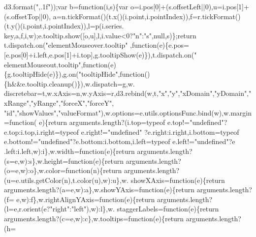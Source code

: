 \begin{DoxyCode}
      d3.format(\textcolor{stringliteral}{",.1f"}));var b=\textcolor{keyword}{function}(i,s)\{var o=i.pos[0]+(s.offsetLeft||0),u=i.pos[1]+(s.offsetTop||0),
      a=n.tickFormat()(t.x()(i.point,i.pointIndex)),f=r.tickFormat()(t.y()(i.point,i.pointIndex)),l=p(i.series.
      key,a,f,i,w);e.tooltip.show([o,u],l,i.value<0?\textcolor{stringliteral}{"n"}:\textcolor{stringliteral}{"s"},null,s)\};\textcolor{keywordflow}{return} t.dispatch.on(\textcolor{stringliteral}{"elementMouseover.tooltip"}
      ,\textcolor{keyword}{function}(e)\{e.pos=[e.pos[0]+i.left,e.pos[1]+i.top],g.tooltipShow(e)\}),t.dispatch.on(\textcolor{stringliteral}{"
      elementMouseout.tooltip"},\textcolor{keyword}{function}(e)\{g.tooltipHide(e)\}),g.on(\textcolor{stringliteral}{"tooltipHide"},\textcolor{keyword}{function}()\{h&&e.tooltip.cleanup()\}),w.dispatch=g,w.
      discretebar=t,w.xAxis=n,w.yAxis=r,d3.rebind(w,t,\textcolor{stringliteral}{"x"},\textcolor{stringliteral}{"y"},\textcolor{stringliteral}{"xDomain"},\textcolor{stringliteral}{"yDomain"},\textcolor{stringliteral}{"xRange"},\textcolor{stringliteral}{"yRange"},\textcolor{stringliteral}{"forceX"},\textcolor{stringliteral}{"forceY"},\textcolor{stringliteral}{
      "id"},\textcolor{stringliteral}{"showValues"},\textcolor{stringliteral}{"valueFormat"}),w.options=e.utils.optionsFunc.bind(w),w.margin=\textcolor{keyword}{function}(
      e)\{\textcolor{keywordflow}{return} arguments.length?(i.top=typeof e.top!=\textcolor{stringliteral}{"undefined"}?e.top:i.top,i.right=typeof e.right!=\textcolor{stringliteral}{"undefined"}
      ?e.right:i.right,i.bottom=typeof e.bottom!=\textcolor{stringliteral}{"undefined"}?e.bottom:i.bottom,i.left=typeof e.left!=\textcolor{stringliteral}{"undefined"}?e
      .left:i.left,w):i\},w.width=\textcolor{keyword}{function}(e)\{\textcolor{keywordflow}{return} arguments.length?(s=e,w):s\},w.height=\textcolor{keyword}{function}(e)\{\textcolor{keywordflow}{return} 
      arguments.length?(o=e,w):o\},w.color=\textcolor{keyword}{function}(n)\{\textcolor{keywordflow}{return} arguments.length?(u=e.utils.getColor(n),t.color(u),w):u\},w.
      showXAxis=\textcolor{keyword}{function}(e)\{\textcolor{keywordflow}{return} arguments.length?(a=e,w):a\},w.showYAxis=\textcolor{keyword}{function}(e)\{\textcolor{keywordflow}{return} arguments.length?(f=
      e,w):f\},w.rightAlignYAxis=\textcolor{keyword}{function}(e)\{\textcolor{keywordflow}{return} arguments.length?(l=e,r.orient(e?\textcolor{stringliteral}{"right"}:\textcolor{stringliteral}{"left"}),w):l\},w.
      staggerLabels=\textcolor{keyword}{function}(e)\{\textcolor{keywordflow}{return} arguments.length?(c=e,w):c\},w.tooltips=\textcolor{keyword}{function}(e)\{\textcolor{keywordflow}{return} arguments.length?(h=

\end{DoxyCode}
